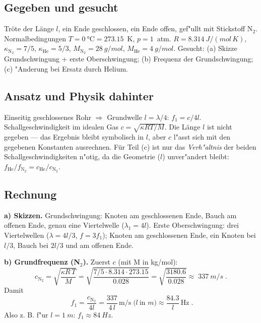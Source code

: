 
\subsection*{Gegeben und gesucht}
Tröte der Länge $l$, ein Ende geschlossen, ein Ende offen, gef"ullt mit
Stickstoff N$_2$. Normalbedingungen $T=\qty{0}{\celsius}=273.15$~K,
$p=1$~atm. $R=\qty{8.314}{J/(mol\,K)}$, $\kappa_{\mathrm{N}_2}=7/5$,
$\kappa_{\mathrm{He}}=5/3$, $M_{\mathrm{N}_2}=\qty{28}{g/mol}$,
$M_{\mathrm{He}}=\qty{4}{g/mol}$. Gesucht: (a) Skizze Grundschwingung +
erste Oberschwingung; (b) Frequenz der Grundschwingung; (c) "Anderung bei
Ersatz durch Helium.

\subsection*{Ansatz und Physik dahinter}
Einseitig geschlossenes Rohr $\Rightarrow$ Grundwelle $l=\lambda/4$:
$f_1=c/4l$. Schallgeschwindigkeit im idealen Gas $c=\sqrt{\kappa R T/M}$.
Die Länge $l$ ist nicht gegeben --- das Ergebnis bleibt symbolisch in $l$,
aber $c$ l"asst sich mit den gegebenen Konstanten ausrechnen. Für Teil (c)
ist nur das \emph{Verh"altnis} der beiden Schallgeschwindigkeiten n"otig,
da die Geometrie ($l$) unver"andert bleibt: $f_{\mathrm{He}}/f_{\mathrm{N}_2}
=c_{\mathrm{He}}/c_{\mathrm{N}_2}$.

\subsection*{Rechnung}
\textbf{a) Skizzen.} Grundschwingung: Knoten am geschlossenen Ende, Bauch am
offenen Ende, genau eine Viertelwelle ($\lambda_1=4l$). Erste Oberschwingung:
drei Viertelwellen ($\lambda=4l/3$, $f=3f_1$); Knoten am geschlossenen Ende,
ein Knoten bei $l/3$, Bauch bei $2l/3$ und am offenen Ende.

\textbf{b) Grundfrequenz (N$_2$).} Zuerst $c$ (mit M in \unit{kg/mol}):
\begin{equation}
  c_{\mathrm{N}_2}
  =\sqrt{\frac{\kappa R\,T}{M}}
  =\sqrt{\frac{7/5\cdot8.314\cdot273.15}{0.028}}
  =\sqrt{\frac{3180.6}{0.028}}
  \approx\boxed{\;\qty{337}{m/s}\;}.
\end{equation}
Damit
\begin{equation}
  \boxed{\;f_1=\frac{c_{\mathrm{N}_2}}{4l}
  =\frac{337}{4\,l}\,\mathrm{m/s}\;\bigl(l\ \text{in } m\bigr)
  \approx\frac{84.3}{l}\,\mathrm{Hz}\;}.
\end{equation}
Also z. B. f"ur $l=\qty{1}{m}$: $f_1\approx\qty{84}{Hz}$.

